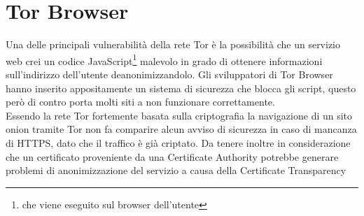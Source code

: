 \section{Tor Browser}
Una delle principali vulnerabilità della rete Tor è la possibilità che un servizio web crei un codice JavaScript\footnote{che viene eseguito sul browser dell'utente} malevolo in grado di ottenere informazioni sull'indirizzo dell'utente deanonimizzandolo. 
Gli sviluppatori di Tor Browser hanno inserito appositamente un sistema di sicurezza che blocca gli script, questo però di contro porta molti siti a non funzionare correttamente. \\
Essendo la rete Tor fortemente basata sulla criptografia la navigazione di un sito onion tramite Tor non fa comparire alcun avviso di sicurezza in caso di mancanza di HTTPS, dato che il traffico è già criptato. 
Da tenere inoltre in considerazione che un certificato proveniente da una Certificate Authority potrebbe generare problemi di anonimizzazione del servizio a causa della Certificate Transparency\cite{CertificateTransparency} \\


